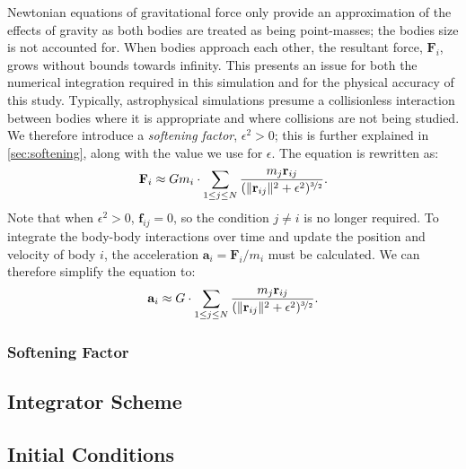 Newtonian equations of gravitational force only provide an approximation of the effects of gravity as both bodies are treated as being point-masses; the bodies size is not accounted for. When bodies approach each other, the resultant force, $\mathbf{F}_{i}$, grows without bounds towards infinity. This presents an issue for both the numerical integration required in this simulation and for the physical accuracy of this study. Typically, astrophysical simulations presume a collisionless interaction between bodies where it is appropriate and where collisions are not being studied. We therefore introduce a {\itshape softening factor\/}, $\epsilon^2>0$; this is further explained in \autoref{sec:softening}, along with the value we use for $\epsilon$. The equation is rewritten as:
\[
    \mathbf{F}_i\approx Gm_{i}\cdot \sum_{1\leq j\leq N}\frac{m_{j}\mathbf{r}_{ij}}{(\|\mathbf{r}_{ij}\|^2+\epsilon^2)^{\nicefrac{3}{2}}}.
\]
Note that when $\epsilon^2>0$, $\mathbf{f}_{ij}=0$, so the condition $j\neq i$ is no longer required. To integrate the body-body interactions over time and update the position and velocity of body $i$, the acceleration $\mathbf{a}_{i}=\mathbf{F}_{i}/m_{i}$ must be calculated. We can therefore simplify the equation to:
\[ 
    \mathbf{a}_i\approx G\cdot \sum_{1\leq j\leq N}\frac{m_{j}\mathbf{r}_{ij}}{(\|\mathbf{r}_{ij}\|^2+\epsilon^2)^{\nicefrac{3}{2}}}.
\]

\subsubsection{Softening Factor}\label{sec:softening}

{ \lipsum[9] }

\subsection{Integrator Scheme}

{ \lipsum[2-4] }

\subsection{Initial Conditions}

{ \lipsum[10] }
